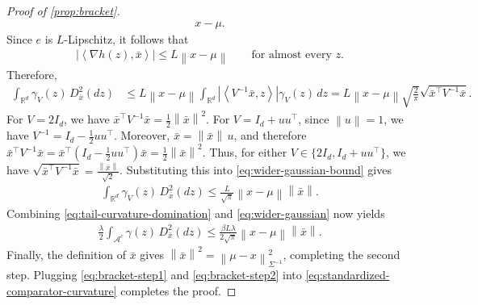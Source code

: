 \documentclass[11pt]{article}
\newcommand{\R}{\mathbb R}
\newcommand{\E}{\mathbb E}
\newcommand{\tr}{\operatorname{tr}}
\newcommand{\1}{\mathbf 1}
\newcommand{\ip}[2]{\left\langle #1,#2\right\rangle}
\newcommand{\norm}[1]{\left\lVert #1\right\rVert}
\newcommand{\normm}[2]{\left\lVert #1\right\rVert_{#2}}
\begin{document}
\begin{proof}[Proof of \cref{prop:bracket}]
\begin{align}
        {x-\mu}.
    \end{align}
    Since $e$ is $L$-Lipschitz, it follows that
    \begin{align}
        \left|\ip{\nabla h(z)}{\bar{x}}\right|
        \leq
        L\norm{x-\mu}
        \qquad\text{for almost every }z.
    \end{align}
    Therefore,
    \begin{align}
        \int_{\R^d}\gamma_V(z)\,D^2_{\bar{x}}(dz)
         & \leq
        L\norm{x-\mu}
        \int_{\R^d}
        \left|\ip{V^{-1}\bar{x}}{z}\right|
        \gamma_V(z)\,dz
        =
        L\norm{x-\mu}
        \sqrt{\frac{2}{\pi}}
        \sqrt{\bar{x}^\top V^{-1}\bar{x}}.
        \label{eq:wider-gaussian-bound}
    \end{align}
    For $V=2I_d$, we have
    $\bar{x}^\top V^{-1}\bar{x}=\frac12\norm{\bar{x}}^2$.
    For $V=I_d+uu^\top$, since $\norm u=1$,
    we have
    $V^{-1}
        =
        I_d-\frac12uu^\top$.
    Moreover, $\bar{x}=\norm{\bar{x}}\,u$, and therefore
    $\bar{x}^\top V^{-1}\bar{x}=
        \bar{x}^\top
        \left(I_d-\frac12uu^\top\right)\bar{x}
        =\frac12\norm{\bar{x}}^2$.
    Thus, for either
    $V\in\{2I_d,I_d+uu^\top\}$,
    we have
    $\sqrt{\bar{x}^\top V^{-1}\bar{x}} = \frac{\norm{\bar{x}}}{\sqrt2}$.
    Substituting this into \eqref{eq:wider-gaussian-bound} gives
    \begin{align}
        \int_{\R^d}\gamma_V(z)\,D^2_{\bar{x}}(dz)
        \leq
        \frac{L}{\sqrt\pi}
        \norm{x-\mu}\norm{\bar{x}}.
        \label{eq:wider-gaussian}
    \end{align}
    Combining \eqref{eq:tail-curvature-domination} and
    \eqref{eq:wider-gaussian} now yields
    \begin{align}
        \frac{\lambda}{2}\int_{\mathcal A^c}\gamma(z)\,D^2_{\bar{x}}(dz)
        \leq
        \frac{\beta L \lambda}{2\sqrt\pi}
        \norm{x-\mu}\norm{\bar{x}}.
        \label{eq:bracket-step2}
    \end{align}
    Finally, the definition of $\bar{x}$ gives
    $\norm{\bar{x}}^2=\normm{\mu-x}{\Sigma^{-1}}^2$,
    completing the second step.
    Plugging \eqref{eq:bracket-step1} and \eqref{eq:bracket-step2}
    into \eqref{eq:standardized-comparator-curvature}
    completes the proof.
\end{proof}
\end{document}
